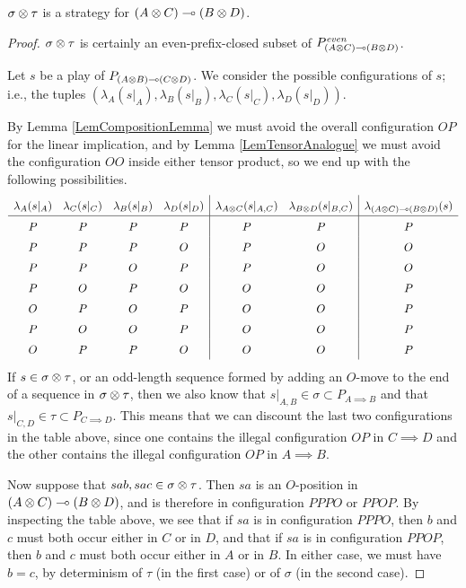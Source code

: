 \begin{proposition}
  $\sigma\otimes\tau$ is a strategy for $(A\otimes C)\multimap (B\otimes D)$.
  \label{PropTensorWellDefined}
\end{proposition}
\begin{proof}
  $\sigma\otimes\tau$ is certainly an even-prefix-closed subset of $P_{(A\otimes C)\multimap (B\otimes D)}^{\textit{even}}$.  

  Let $s$ be a play of $P_{(A\otimes B)\multimap (C\otimes D)}$.  
  We consider the possible configurations of $s$; i.e., the tuples $(\lambda_A(s\vert_A),\lambda_B(s\vert_B),\lambda_C(s\vert_C),\lambda_D(s\vert_D))$.

  By Lemma \ref{LemCompositionLemma} we must avoid the overall configuration $OP$ for the linear implication, and by Lemma \ref{LemTensorAnalogue} we must avoid the configuration $OO$ inside either tensor product, so we end up with the following possibilities.
  \scriptsize
  \[
\arraycolsep=4.8pt\def\arraystretch{1.5}
    \begin{array}{cccc|cc|c}
      \lambda_A(s\vert_A) & \lambda_C(s\vert_C) & \lambda_B(s\vert_B) & \lambda_D(s\vert_D) & \lambda_{A\tensor C}(s\vert_{A,C}) & \lambda_{B\tensor D}(s\vert_{B,C}) & \lambda_{(A\tensor C)\implies (B\tensor D)}(s) \\
      \hline
      P & P & P & P & P & P & P \\
      P & P & P & O & P & O & O \\
      P & P & O & P & P & O & O \\
      P & O & P & O & O & O & P \\
      O & P & O & P & O & O & P \\
      P & O & O & P & O & O & P \\
      O & P & P & O & O & O & P \\
    \end{array}
    \]
  \normalsize
  If $s\in\sigma\otimes\tau$, or an odd-length sequence formed by adding an $O$-move to the end of a sequence in $\sigma\otimes\tau$, then we also know that $s\vert_{A,B}\in\sigma\subset P_{A\implies B}$ and that $s\vert_{C,D}\in\tau\subset P_{C\implies D}$.  
  This means that we can discount the last two configurations in the table above, since one contains the illegal configuration $OP$ in $C\implies D$ and the other contains the illegal configuration $OP$ in $A \implies B$.

  Now suppose that $sab,sac\in\sigma\otimes\tau$.  
  Then $sa$ is an $O$-position in $(A\otimes C)\multimap (B\otimes D)$, and is therefore in configuration $PPPO$ or $PPOP$.  
  By inspecting the table above, we see that if $sa$ is in configuration $PPPO$, then $b$ and $c$ must both occur either in $C$ or in $D$, and that if $sa$ is in configuration $PPOP$, then $b$ and $c$ must both occur either in $A$ or in $B$.  
  In either case, we must have $b=c$, by determinism of $\tau$ (in the first case) or of $\sigma$ (in the second case).
\end{proof}

